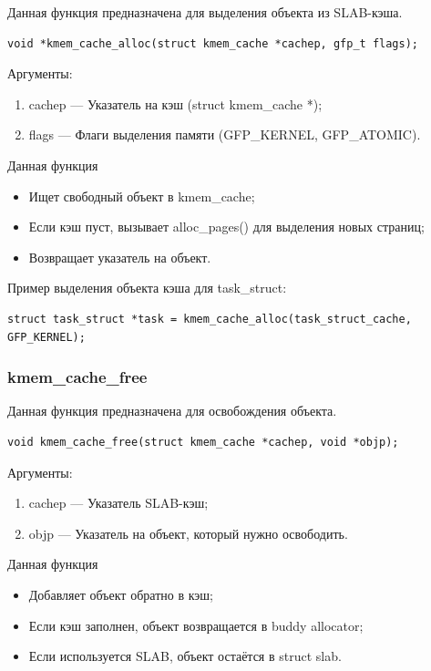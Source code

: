 Данная функция предназначена для выделения объекта из SLAB-кэша.
\begin{lstlisting}
void *kmem_cache_alloc(struct kmem_cache *cachep, gfp_t flags);
\end{lstlisting}

Аргументы:
\begin{enumerate}
    \item cachep --- Указатель на кэш (struct kmem\_cache *);
    \item flags --- Флаги выделения памяти (GFP\_KERNEL, GFP\_ATOMIC).
\end{enumerate}

Данная функция
\begin{itemize}
    \item Ищет свободный объект в kmem\_cache;
    \item Если кэш пуст, вызывает alloc\_pages() для выделения новых страниц;
    \item Возвращает указатель на объект.
\end{itemize}

Пример выделения объекта кэша для task\_struct:

\begin{lstlisting}
struct task_struct *task = kmem_cache_alloc(task_struct_cache, GFP_KERNEL);
\end{lstlisting}

\subsubsection*{kmem\_cache\_free}

Данная функция предназначена для освобождения объекта.

\begin{lstlisting}
void kmem_cache_free(struct kmem_cache *cachep, void *objp);
\end{lstlisting}

Аргументы:
\begin{enumerate}
    \item cachep --- Указатель SLAB-кэш;
    \item objp --- Указатель на объект, который нужно освободить.
\end{enumerate}

Данная функция
\begin{itemize}
    \item Добавляет объект обратно в кэш;
    \item Если кэш заполнен, объект возвращается в buddy allocator;
    \item Если используется SLAB, объект остаётся в struct slab.
\end{itemize}

